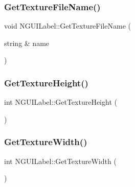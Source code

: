 \hypertarget{class_n_g_u_i_label_a25e41385e7ce214dca5c77dae15cf1d3}{}\label{class_n_g_u_i_label_a25e41385e7ce214dca5c77dae15cf1d3} 
\subsubsection{\texorpdfstring{Get\+Texture\+File\+Name()}{GetTextureFileName()}}
{\footnotesize\ttfamily void N\+G\+U\+I\+Label\+::\+Get\+Texture\+File\+Name (\begin{DoxyParamCaption}\item[{string \&}]{name }\end{DoxyParamCaption})}

\hypertarget{class_n_g_u_i_label_a84326eae610ef738dccf3a007c980056}{}\label{class_n_g_u_i_label_a84326eae610ef738dccf3a007c980056} 
\subsubsection{\texorpdfstring{Get\+Texture\+Height()}{GetTextureHeight()}}
{\footnotesize\ttfamily int N\+G\+U\+I\+Label\+::\+Get\+Texture\+Height (\begin{DoxyParamCaption}{ }\end{DoxyParamCaption})}

\hypertarget{class_n_g_u_i_label_ad529bb484c268754db147a9fe84d770d}{}\label{class_n_g_u_i_label_ad529bb484c268754db147a9fe84d770d} 
\subsubsection{\texorpdfstring{Get\+Texture\+Width()}{GetTextureWidth()}}
{\footnotesize\ttfamily int N\+G\+U\+I\+Label\+::\+Get\+Texture\+Width (\begin{DoxyParamCaption}{ }\end{DoxyParamCaption})}

\hypertarget{class_n_g_u_i_label_a9de9554329092f709757eff7dd1350b2}{}\label{class_n_g_u_i_label_a9de9554329092f709757eff7dd1350b2} 
